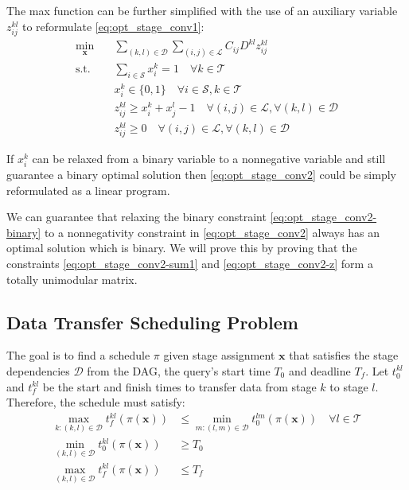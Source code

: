 The max function can be further simplified with the use of an auxiliary variable $z_{ij}^{kl}$ to reformulate \eqref{eq:opt_stage_conv1}:
\begin{subequations}\label{eq:opt_stage_conv2}
	\begin{align}
		\min_{\mathbf{x}} \quad & \sum_{(k,l)\in\mathcal{D}}\sum_{(i,j)\in\mathcal{L}}C_{ij}D^{kl}z_{ij}^{kl} \nonumber \\
		\text{s.t.}\quad & \sum_{i\in\mathcal{S}}x_i^k = 1 \quad \forall k\in\mathcal{T} \label{eq:opt_stage_conv2-sum1} \\
		& x_i^k \in \{0,1\} \quad \forall i\in\mathcal{S},k\in\mathcal{T} \label{eq:opt_stage_conv2-binary} \\
		& z_{ij}^{kl} \geq x_i^k+x_j^l-1 \quad \forall (i,j)\in\mathcal{L}, \forall(k,l)\in\mathcal{D} \label{eq:opt_stage_conv2-z}\\
		& z_{ij}^{kl} \geq 0 \quad \forall (i,j)\in\mathcal{L}, \forall(k,l)\in\mathcal{D}
	\end{align}
\end{subequations}

If $x_{i}^k$ can be relaxed from a binary variable to a nonnegative variable and still guarantee a binary optimal solution then \eqref{eq:opt_stage_conv2} could be simply reformulated as a linear program.

\begin{conjecture}
	We can guarantee that relaxing the binary constraint \eqref{eq:opt_stage_conv2-binary} to a nonnegativity constraint in \eqref{eq:opt_stage_conv2} always has an optimal solution which is binary.
	We will prove this by proving that the constraints \eqref{eq:opt_stage_conv2-sum1} and  \eqref{eq:opt_stage_conv2-z} form a totally unimodular matrix.
\end{conjecture}

\subsection{Data Transfer Scheduling Problem}

The goal is to find a schedule $\pi$ given stage assignment $\mathbf{x}$ that satisfies the stage dependencies $\mathcal{D}$ from the DAG, the query's start time $T_0$ and deadline $T_f$.
Let $t_0^{kl}$ and $t_f^{kl}$ be the start and finish times to transfer data from stage $k$ to stage $l$.
Therefore, the schedule must satisfy:
\begin{subequations}
	\begin{align}
		\max_{k:(k,l)\in\mathcal{D}}t_f^{kl}(\pi(\mathbf{x})) & \leq \min_{m:(l,m)\in\mathcal{D}}t_0^{lm}(\pi(\mathbf{x})) \quad \forall l\in\mathcal{T} \\
		\min_{(k,l)\in\mathcal{D}}t_0^{kl}(\pi(\mathbf{x})) & \geq T_0 \\
		\max_{(k,l)\in\mathcal{D}}t_f^{kl}(\pi(\mathbf{x})) & \leq T_f
	\end{align}
\end{subequations}

